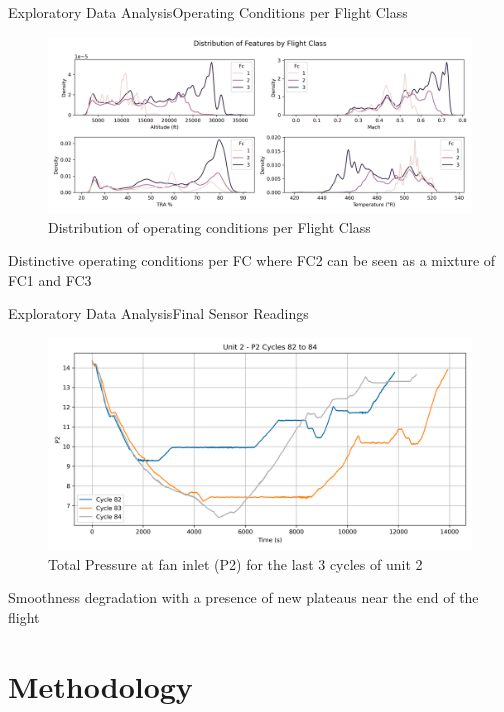 \documentclass{beamer}
\begin{document}
        \begin{frame}{Exploratory Data Analysis}{Operating Conditions per Flight Class}
            \begin{figure}[!htbp]
                \centering
                \includegraphics[scale=0.35]{features_per_condition_fc.png}
                \caption{Distribution of operating conditions per Flight Class}
            \end{figure}

            Distinctive operating conditions per FC where FC2 can be seen as a mixture of FC1 and FC3
        \end{frame}

        \begin{frame}{Exploratory Data Analysis}{Final Sensor Readings}
            \begin{figure}[!htbp]
                \centering
                \includegraphics[scale=0.35]{unit_2_P2_cycles_82_84.png}
                \caption{Total Pressure at fan inlet (P2) for the last 3 cycles of unit 2}
            \end{figure}
            Smoothness degradation with a presence of new plateaus near the end of the flight
        \end{frame}

    \section{Methodology}
\end{document}
